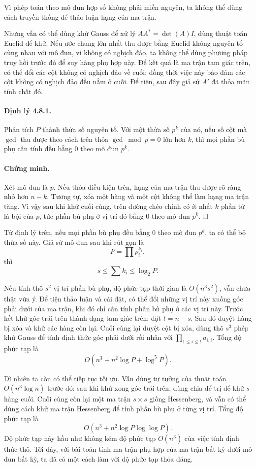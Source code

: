 \documentclass[11pt]{article}
\newcommand{\proofbox}{\ensuremath{\vcenter{\hrule height 0.45pt
  \hbox{\vrule width 0.45pt height 6pt\kern 6pt\vrule width 0.45pt}
  \hrule height 0.45pt}}}
\begin{document}
Vì phép toán theo mô đun hợp số không phải miền nguyên, ta không thể dùng cách
truyền thống để thảo luận hạng của ma trận.

Nhưng vẫn có thể dùng khử Gauss để xử lý \(AA^\ast=\det(A)I\), dùng thuật toán
Euclid để khử. Nếu ước chung lớn nhất thu được bằng Euclid không nguyên tố cùng
nhau với mô đun, vì không có nghịch đảo, ta không thể dùng phương pháp truy hồi
trước đó để suy hàng phụ hợp này. Để kết quả là ma trận tam giác trên, có thể
đổi các cột không có nghịch đảo về cuối; đồng thời việc này bảo đảm các cột
không có nghịch đảo đều nằm ở cuối. Để tiện, sau đây giả sử \(A'\) đã thỏa mãn
tính chất đó.

\paragraph{Định lý 4.8.1.}
Phân tích \(P\) thành thừa số nguyên tố. Với một thừa số \(p^k\) của nó, nếu số
cột mà \(\gcd\) thu được theo cách trên thỏa \(\gcd\bmod p=0\) lớn hơn \(k\),
thì mọi phần bù phụ cần tính đều bằng \(0\) theo mô đun \(p^k\).

\paragraph{Chứng minh.}
Xét mô đun là \(p\). Nếu thỏa điều kiện trên, hạng của ma trận thu được rõ ràng
nhỏ hơn \(n-k\). Tương tự, xóa một hàng và một cột không thể làm hạng ma trận
tăng. Vì vậy sau khi khử cuối cùng, trên đường chéo chính có ít nhất \(k\) phần
tử là bội của \(p\), tức phần bù phụ ở vị trí đó bằng \(0\) theo mô đun
\(p^k\). \(\proofbox\)

Từ định lý trên, nếu mọi phần bù phụ đều bằng \(0\) theo mô đun \(p^k\), ta có
thể bỏ thừa số này. Giả sử mô đun sau khi rút gọn là
\[
  P=\prod p_i^{k_i},
\]
thì
\[
  s\le \sum k_i\le \log_2 P.
\]

Nếu tính thô \(s^2\) vị trí phần bù phụ, độ phức tạp thời gian là
\(O(n^3s^2)\), vẫn chưa thật vừa ý. Để tiện thảo luận và cài đặt, có thể đổi
những vị trí này xuống góc phải dưới của ma trận, khi đó chỉ cần tính phần bù
phụ ở các vị trí này. Trước hết khử góc trái trên thành dạng tam giác trên; đặt
\(t=n-s\). Sau đó duyệt hàng bị xóa và khử các hàng còn lại. Cuối cùng lại duyệt
cột bị xóa, dùng thô \(s^3\) phép khử Gauss để tính định thức góc phải dưới rồi
nhân với \(\prod_{1\le i\le t}a_{i,i}\). Tổng độ phức tạp là
\[
  O(n^3+n^2\log P+\log^5 P).
\]

Dĩ nhiên ta còn có thể tiếp tục tối ưu. Vẫn dùng tư tưởng của thuật toán
\(O(n^3\log n)\) trước đó: sau khi khử xong góc trái trên, dùng chia để trị để
khử \(s\) hàng cuối. Cuối cùng còn lại một ma trận \(s\times s\) giống
Hessenberg, và vẫn có thể dùng cách khử ma trận Hessenberg để tính phần bù phụ ở
từng vị trí. Tổng độ phức tạp là
\[
  O(n^3+n^2\log P\log\log P).
\]
Độ phức tạp này hầu như không kém độ phức tạp \(O(n^3)\) của việc tính định thức
thô. Tới đây, với bài toán tính ma trận phụ hợp của ma trận bất kỳ dưới mô đun
bất kỳ, ta đã có một cách làm với độ phức tạp thỏa đáng.
\end{document}
